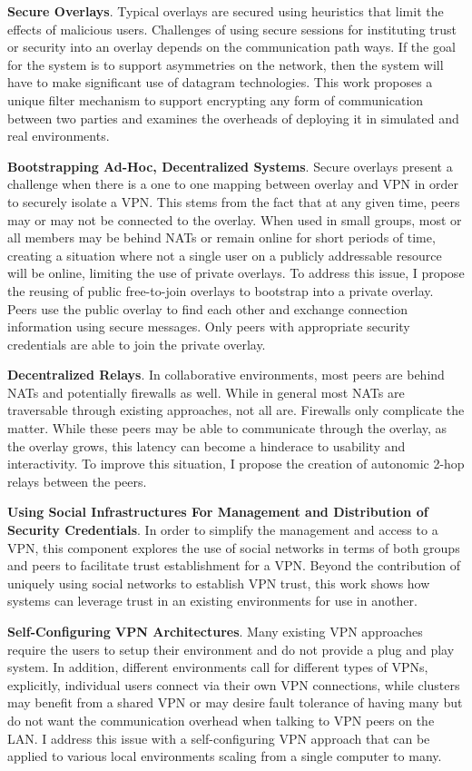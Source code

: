 {\bf Secure Overlays}. Typical overlays are secured using heuristics that limit
the effects of malicious users.  Challenges of using secure sessions for
instituting trust or security into an overlay depends on the communication path
ways.  If the goal for the system is to support asymmetries on the network,
then the system will have to make significant use of datagram technologies.
This work proposes a unique filter mechanism to support encrypting any form of
communication between two parties and examines the overheads of deploying it in
simulated and real environments.

{\bf Bootstrapping Ad-Hoc, Decentralized Systems}. Secure overlays present a
challenge when there is a one to one mapping between overlay and VPN in order
to securely isolate a VPN.  This stems from the fact that at any given time,
peers may or may not be connected to the overlay.  When used in small groups,
most or all members may be behind NATs or remain online for short periods of
time, creating a situation where not a single user on a publicly addressable
resource will be online, limiting the use of private overlays.  To address this
issue, I propose the reusing of public free-to-join overlays to bootstrap into
a private overlay.  Peers use the public overlay to find each other and
exchange connection information using secure messages.  Only peers with
appropriate security credentials are able to join the private overlay.

{\bf Decentralized Relays}. In collaborative environments, most peers are
behind NATs and potentially firewalls as well.  While in general most NATs are
traversable through existing approaches, not all are.  Firewalls only
complicate the matter.  While these peers may be able to communicate through
the overlay, as the overlay grows, this latency can become a hinderace to
usability and interactivity.  To improve this situation, I propose the creation
of autonomic 2-hop relays between the peers.

{\bf Using Social Infrastructures For Management and Distribution of Security
Credentials}. In order to simplify the management and access to a VPN, this
component explores the use of social networks in terms of both groups and peers
to facilitate trust establishment for a VPN.  Beyond the contribution of
uniquely using social networks to establish VPN trust, this work shows how
systems can leverage trust in an existing environments for use in another.

{\bf Self-Configuring VPN Architectures}. Many existing VPN approaches require
the users to setup their environment and do not provide a plug and play system.
In addition, different environments call for different types of VPNs,
explicitly, individual users connect via their own VPN connections, while
clusters may benefit from a shared VPN or may desire fault tolerance of having
many but do not want the communication overhead when talking to VPN peers on
the LAN.  I address this issue with a self-configuring VPN approach that can be
applied to various local environments scaling from a single computer to many.


